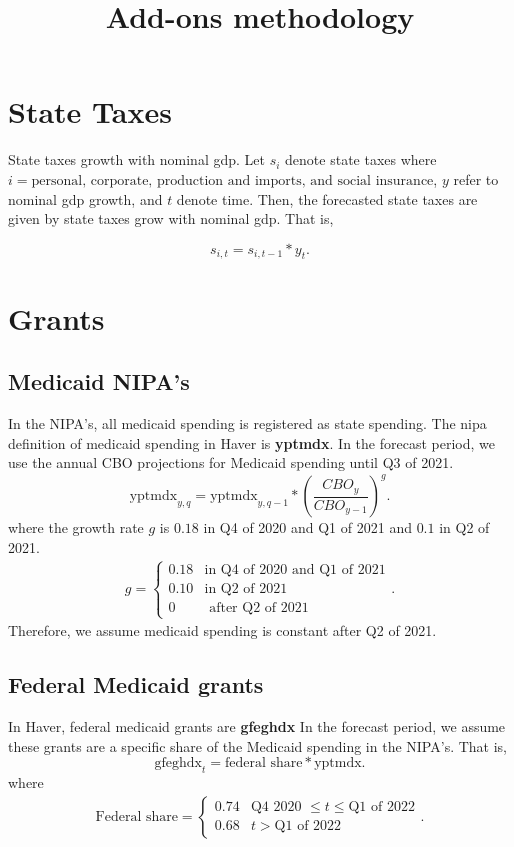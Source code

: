 \documentclass[a4paper]{article}
\title{Add-ons methodology}
\begin{document}
  \maketitle
  \section{State Taxes} 
State taxes growth with nominal gdp. Let $s_i$ denote state taxes where $i = \text{personal,
corporate, production and imports, and social insurance}$, $y$ refer to nominal gdp growth,  and $t$ denote time. Then, the forecasted state taxes are
given by 
state taxes grow with nominal gdp. That is, 

\[
  s_{i,t}= s_{i,t-1} * y_{t}
.\]
\section{Grants}

\subsection{Medicaid NIPA's}
In the NIPA's, all medicaid spending is registered as state spending. The nipa definition of
medicaid spending in Haver is \textbf{yptmdx}. In the forecast period, we use the annual
CBO projections for Medicaid spending until Q3 of 2021.
\[
  \text{yptmdx}_{y, q} = \text{yptmdx}_{y, q-1}  * (\frac{CBO_{y}}{CBO_{y-1}})^{g}
.\] 
where the growth rate $g$ is  $0.18$ in Q4 of 2020 and Q1 of 2021 and  $0.1$ in Q2 of 2021.
\begin{align*}
  g = \begin{cases}
    0.18 & \text{in Q4 of 2020 and Q1 of 2021} \\
    0.10 & \text{in Q2 of 2021} \\
    0 & \text{ after Q2 of 2021 }
  \end{cases} 
.\end{align*}
Therefore, we assume medicaid spending is constant after Q2 of 2021.
\subsection{Federal Medicaid grants}
In Haver, federal medicaid grants are \textbf{gfeghdx} 
In the forecast period, we assume these grants are a specific share of the Medicaid spending in the
NIPA's. That is, 
\[
\text{gfeghdx}_t = \text{federal share} * \text{yptmdx}
.\] 
where 
\begin{align*}
  \text{Federal share} = \begin{cases}
    0.74 & \text{Q4 2020 } \le t \le \text{Q1 of 2022} \\
    0.68 & t > \text{Q1 of 2022}
  \end{cases}
.\end{align*}
\end{document}
